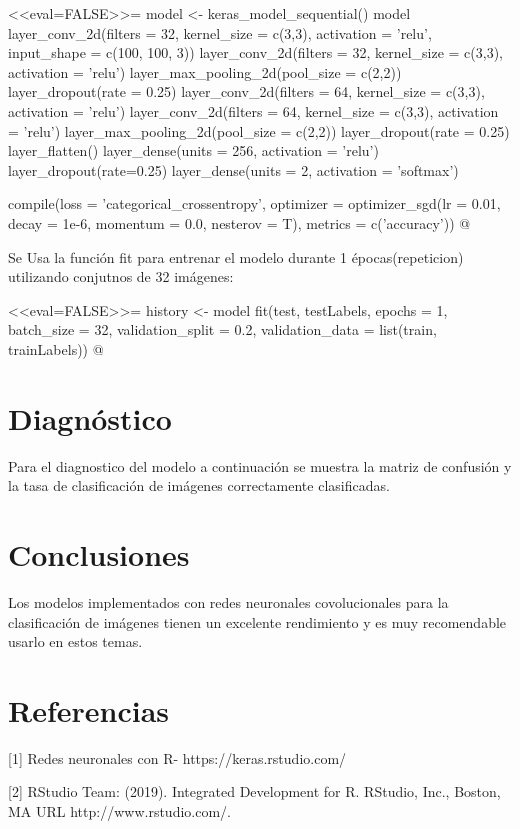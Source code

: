 \documentclass[11pt,twoside]{article}
\begin{document}
<<eval=FALSE>>=
model <- keras_model_sequential()
model %
layer_conv_2d(filters = 32, 
kernel_size = c(3,3),
activation = 'relu',
input_shape = c(100, 100, 3)) %
layer_conv_2d(filters = 32,
kernel_size = c(3,3),
activation = 'relu') %
layer_max_pooling_2d(pool_size = c(2,2)) %
layer_dropout(rate = 0.25) %
layer_conv_2d(filters = 64,
kernel_size = c(3,3),
activation = 'relu') %
layer_conv_2d(filters = 64,
kernel_size = c(3,3),
activation = 'relu') %
layer_max_pooling_2d(pool_size = c(2,2)) %
layer_dropout(rate = 0.25) %
layer_flatten() %
layer_dense(units = 256, activation = 'relu') %
layer_dropout(rate=0.25) %
layer_dense(units = 2, activation = 'softmax') %

compile(loss = 'categorical_crossentropy',
optimizer = optimizer_sgd(lr = 0.01,
decay = 1e-6,
momentum = 0.0,
nesterov = T),
metrics = c('accuracy'))
@

Se Usa la función fit para entrenar el modelo durante 1 épocas(repeticion) utilizando conjutnos de 32 imágenes:

<<eval=FALSE>>=
history <- model %
fit(test,
testLabels,
epochs = 1,
batch_size = 32,
validation_split = 0.2,
validation_data = list(train, trainLabels))
@


\section*{Diagnóstico}
\noindent
Para el diagnostico del modelo a continuación se muestra la matriz de confusión y la tasa de clasificación de imágenes correctamente clasificadas.


\section*{Conclusiones}
\noindent
Los modelos implementados con redes neuronales covolucionales para la clasificación de imágenes tienen un excelente rendimiento y es muy recomendable usarlo en estos temas. 




\section*{Referencias}
[1] Redes neuronales con R- https://keras.rstudio.com/ 
\vspace{5mm}

[2] RStudio Team: (2019). Integrated Development for R. RStudio, Inc., Boston, MA URL
http://www.rstudio.com/.
\end{document}
